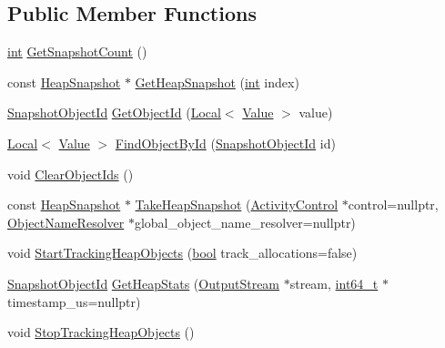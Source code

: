 \subsection*{Public Member Functions}
\begin{DoxyCompactItemize}
\item 
\mbox{\hyperlink{classint}{int}} \mbox{\hyperlink{classv8_1_1HeapProfiler_a24830775a0ab938eb0a29ed8f3dfd265}{Get\+Snapshot\+Count}} ()
\item 
const \mbox{\hyperlink{classv8_1_1HeapSnapshot}{Heap\+Snapshot}} $\ast$ \mbox{\hyperlink{classv8_1_1HeapProfiler_ad76cc22ab8c91d6bd7a065d97c430aea}{Get\+Heap\+Snapshot}} (\mbox{\hyperlink{classint}{int}} index)
\item 
\mbox{\hyperlink{classuint32__t}{Snapshot\+Object\+Id}} \mbox{\hyperlink{classv8_1_1HeapProfiler_ab926a1f1ed95b731d4ef3133e67eef19}{Get\+Object\+Id}} (\mbox{\hyperlink{classv8_1_1Local}{Local}}$<$ \mbox{\hyperlink{classv8_1_1Value}{Value}} $>$ value)
\item 
\mbox{\hyperlink{classv8_1_1Local}{Local}}$<$ \mbox{\hyperlink{classv8_1_1Value}{Value}} $>$ \mbox{\hyperlink{classv8_1_1HeapProfiler_a34d10872fafb761bb96673cf81d1a613}{Find\+Object\+By\+Id}} (\mbox{\hyperlink{classuint32__t}{Snapshot\+Object\+Id}} id)
\item 
void \mbox{\hyperlink{classv8_1_1HeapProfiler_a8a90c630543ed1875cbf9166239ff8d3}{Clear\+Object\+Ids}} ()
\item 
const \mbox{\hyperlink{classv8_1_1HeapSnapshot}{Heap\+Snapshot}} $\ast$ \mbox{\hyperlink{classv8_1_1HeapProfiler_a0e6e52dd0a3dd4f5702294b87a30de3d}{Take\+Heap\+Snapshot}} (\mbox{\hyperlink{classv8_1_1ActivityControl}{Activity\+Control}} $\ast$control=nullptr, \mbox{\hyperlink{classv8_1_1HeapProfiler_1_1ObjectNameResolver}{Object\+Name\+Resolver}} $\ast$global\+\_\+object\+\_\+name\+\_\+resolver=nullptr)
\item 
void \mbox{\hyperlink{classv8_1_1HeapProfiler_a02917db133b7efd468c9c73075a15171}{Start\+Tracking\+Heap\+Objects}} (\mbox{\hyperlink{classbool}{bool}} track\+\_\+allocations=false)
\item 
\mbox{\hyperlink{classuint32__t}{Snapshot\+Object\+Id}} \mbox{\hyperlink{classv8_1_1HeapProfiler_add093717acd067daeddb7ef5fc8b191a}{Get\+Heap\+Stats}} (\mbox{\hyperlink{classv8_1_1OutputStream}{Output\+Stream}} $\ast$stream, \mbox{\hyperlink{classint64__t}{int64\+\_\+t}} $\ast$timestamp\+\_\+us=nullptr)
\item 
void \mbox{\hyperlink{classv8_1_1HeapProfiler_ae448d9474ae34781133d4a4547b08cb1}{Stop\+Tracking\+Heap\+Objects}} ()

\end{DoxyCompactItemize}
